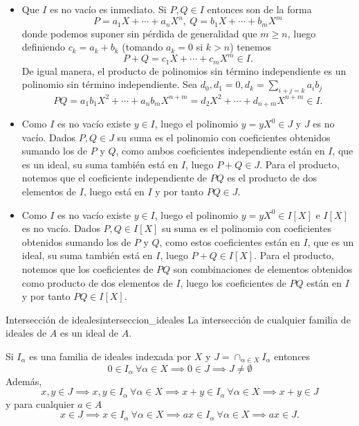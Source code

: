 \begin{proofbox}
    \begin{itemize}
        \item Que \(I\) es no vacío es inmediato. Si $P,Q \in I$ entonces son de la forma
        \[
        P = a_1X + \cdots + a_nX^n,\ Q = b_1X + \cdots + b_mX^m
        \]
        donde podemos suponer sin pérdida de generalidad que $m \geq n$, luego definiendo $c_k = a_k + b_k$ (tomando $a_k = 0$ si $k > n$) tenemos
        \[
        P + Q = c_1 X + \cdots + c_mX^m \in I.
        \]
        De igual manera, el producto de polinomios sin término independiente es un polinomio sin término independiente. Sea $d_0, d_1 = 0, d_k = \sum_{i + j = k} a_{i} b_{j}$
        \[
        PQ = a_1b_1 X^2 + \cdots + a_nb_m X^{n + m} = d_2 X^2 + \cdots + d_{n + m} X^{n + m} \in I.
        \]

        \item Como $I$ es no vacío existe $y \in I$, luego el polinomio $y = yX^0 \in J$ y $J$ es no vacío. Dados $P,Q \in J$ su suma es el polinomio con coeficientes obtenidos sumando los de $P$ y $Q$, como ambos coeficientes independiente están en $I$, que es un ideal, su suma también está en $I$, luego $P + Q \in J$. Para el producto, notemos que el coeficiente independiente de $PQ$ es el producto de dos elementos de $I$, luego está en $I$ y por tanto $PQ \in J$. 

        \item Como $I$ es no vacío existe $y \in I$, luego el polinomio $y = yX^0 \in I[X]$ e $I[X]$ es no vacío. Dados $P,Q \in I[X]$ su suma es el polinomio con coeficientes obtenidos sumando los de $P$ y $Q$, como estos coeficientes están en $I$, que es un ideal, su suma también está en $I$, luego $P + Q \in I[X]$. Para el producto, notemos que los coeficientes de $PQ$ son combinaciones de elementos obtenidos como producto de dos elementos de $I$, luego los coeficientes de $PQ$ están en $I$ y por tanto $PQ \in I[X]$.
    \end{itemize}
\end{proofbox}

\begin{proposition}{Intersección de ideales}{interseccion_ideales}
    La intersección de cualquier familia de ideales de \(A\) es un ideal de \(A\).
\end{proposition}

\begin{proofbox}
    Si $I_\alpha$ es una familia de ideales indexada por $X$ y $J = \cap_{\alpha \in X} I_\alpha$ entonces
    \[
    0 \in I_\alpha \ \forall \alpha \in X \implies 0 \in J \implies J \neq \emptyset
    \]
    Además, 
    \[
    x,y \in J \implies x,y \in I_\alpha \ \forall \alpha \in X \implies x+y \in I_\alpha \ \forall \alpha \in X \implies x+y \in J
    \]
    y para cualquier $a \in A$
    \[
    x \in J \implies x \in I_\alpha \ \forall \alpha \in X \implies ax \in I_\alpha \ \forall \alpha \in X \implies ax \in J.
    \]
\end{proofbox}

